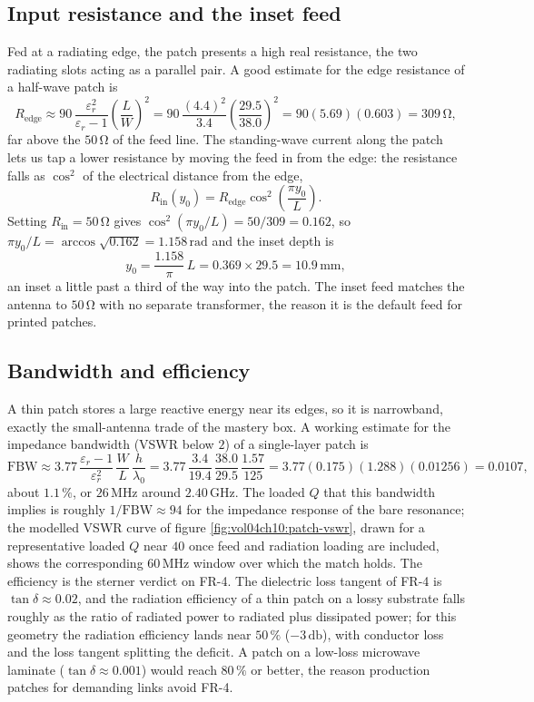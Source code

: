 

\subsection{Input resistance and the inset feed}

Fed at a radiating edge, the patch presents a high real resistance, the
two radiating slots acting as a parallel pair. A good estimate for the
edge resistance of a half-wave patch is
\[
R_{\text{edge}} \approx 90\,\frac{\varepsilon_r^{2}}{\varepsilon_r - 1}
\left(\frac{L}{W}\right)^{2} = 90\,\frac{(4.4)^{2}}{3.4}
\left(\frac{29.5}{38.0}\right)^{2} = 90(5.69)(0.603) = 309\,\si{\ohm},
\]
far above the $50\,\si{\ohm}$ of the feed line. The standing-wave
current along the patch lets us tap a lower resistance by moving the
feed in from the edge: the resistance falls as $\cos^{2}$ of the
electrical distance from the edge,
\[
R_{\text{in}}(y_0) = R_{\text{edge}}\cos^{2}\!\left(\frac{\pi y_0}{L}
\right).
\]
Setting $R_{\text{in}} = 50\,\si{\ohm}$ gives $\cos^{2}(\pi y_0/L) =
50/309 = 0.162$, so $\pi y_0/L = \arccos\sqrt{0.162} = 1.158\,\text{rad}$
and the inset depth is
\[
y_0 = \frac{1.158}{\pi}\,L = 0.369\times 29.5 = 10.9\,\si{\milli\meter},
\]
an inset a little past a third of the way into the patch. The inset feed
matches the antenna to $50\,\si{\ohm}$ with no separate transformer, the
reason it is the default feed for printed patches.

\subsection{Bandwidth and efficiency}

A thin patch stores a large reactive energy near its edges, so it is
narrowband, exactly the small-antenna trade of the mastery box. A
working estimate for the impedance bandwidth (VSWR below $2$) of a
single-layer patch is
\[
\text{FBW} \approx 3.77\,\frac{\varepsilon_r - 1}{\varepsilon_r^{2}}\,
\frac{W}{L}\,\frac{h}{\lambda_0} = 3.77\,\frac{3.4}{19.4}\,
\frac{38.0}{29.5}\,\frac{1.57}{125} = 3.77(0.175)(1.288)(0.01256) =
0.0107,
\]
about $1.1\,\%$, or $26\,\si{\mega\hertz}$ around $2.40\,\si{\giga
\hertz}$. The loaded $Q$ that this bandwidth implies is roughly $1/
\text{FBW}\approx 94$ for the impedance response of the bare resonance;
the modelled VSWR curve of figure \ref{fig:vol04ch10:patch-vswr}, drawn
for a representative loaded $Q$ near $40$ once feed and radiation
loading are included, shows the corresponding $60\,\si{\mega\hertz}$
window over which the match holds. The efficiency is the sterner
verdict on FR-4. The dielectric loss tangent of FR-4 is $\tan\delta
\approx 0.02$, and the radiation efficiency of a thin patch on a lossy
substrate falls roughly as the ratio of radiated power to radiated plus
dissipated power; for this geometry the radiation efficiency lands near
$50\,\%$ ($-3\,\si{\decibel}$), with conductor loss and the loss tangent
splitting the deficit. A patch on a low-loss microwave laminate
($\tan\delta \approx 0.001$) would reach $80\,\%$ or better, the reason
production patches for demanding links avoid FR-4.

